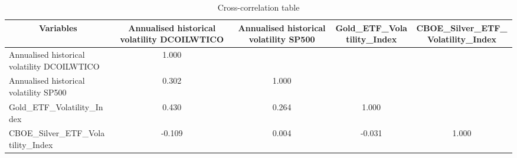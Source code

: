 \begin{table}[htbp]\centering \caption{Cross-correlation table\label{corrtable}}
\begin{tabular}{l  c  c  c  c }\hline\hline
\multicolumn{1}{c}{Variables} &Annualised historical volatility DCOILWTICO&Annualised historical volatility SP500&Gold\_ETF\_Volatility\_Index&CBOE\_Silver\_ETF\_Volatility\_Index\\ \hline
Annualised historical volatility DCOILWTICO&1.000\\
Annualised historical volatility SP500&0.302&1.000\\
Gold\_ETF\_Volatility\_Index&0.430&0.264&1.000\\
CBOE\_Silver\_ETF\_Volatility\_Index&-0.109&0.004&-0.031&1.000\\
\hline \hline 
 \end{tabular}
\end{table}
